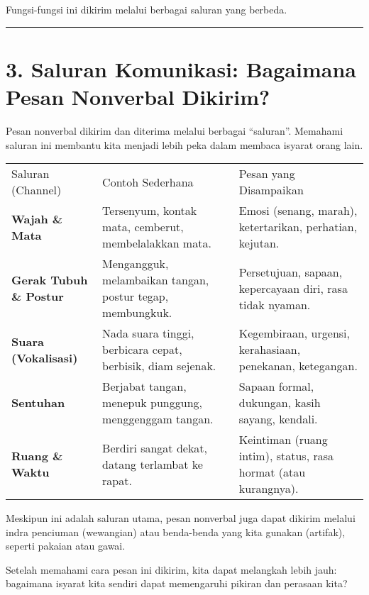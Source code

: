 \documentclass[
  letterpaper,
  DIV=11,
  numbers=noendperiod]{scrreprt}
\begin{document}
Fungsi-fungsi ini dikirim melalui berbagai saluran yang berbeda.

\begin{center}\rule{0.5\linewidth}{0.5pt}\end{center}

\section{3. Saluran Komunikasi: Bagaimana Pesan Nonverbal
Dikirim?}\label{saluran-komunikasi-bagaimana-pesan-nonverbal-dikirim}

Pesan nonverbal dikirim dan diterima melalui berbagai ``saluran''.
Memahami saluran ini membantu kita menjadi lebih peka dalam membaca
isyarat orang lain.

\begin{longtable}[]{@{}
  >{\raggedright\arraybackslash}p{}
  >{\raggedright\arraybackslash}p{}
  >{\raggedright\arraybackslash}p{}@{}}
\toprule\noalign{}
\endhead
\bottomrule\noalign{}
\endlastfoot
Saluran (Channel) & Contoh Sederhana & Pesan yang Disampaikan \\
\textbf{Wajah \& Mata} & Tersenyum, kontak mata, cemberut, membelalakkan
mata. & Emosi (senang, marah), ketertarikan, perhatian, kejutan. \\
\textbf{Gerak Tubuh \& Postur} & Mengangguk, melambaikan tangan, postur
tegap, membungkuk. & Persetujuan, sapaan, kepercayaan diri, rasa tidak
nyaman. \\
\textbf{Suara (Vokalisasi)} & Nada suara tinggi, berbicara cepat,
berbisik, diam sejenak. & Kegembiraan, urgensi, kerahasiaan, penekanan,
ketegangan. \\
\textbf{Sentuhan} & Berjabat tangan, menepuk punggung, menggenggam
tangan. & Sapaan formal, dukungan, kasih sayang, kendali. \\
\textbf{Ruang \& Waktu} & Berdiri sangat dekat, datang terlambat ke
rapat. & Keintiman (ruang intim), status, rasa hormat (atau
kurangnya). \\
\end{longtable}

Meskipun ini adalah saluran utama, pesan nonverbal juga dapat dikirim
melalui indra penciuman (wewangian) atau benda-benda yang kita gunakan
(artifak), seperti pakaian atau gawai.

Setelah memahami cara pesan ini dikirim, kita dapat melangkah lebih
jauh: bagaimana isyarat kita sendiri dapat memengaruhi pikiran dan
perasaan kita?
\end{document}
